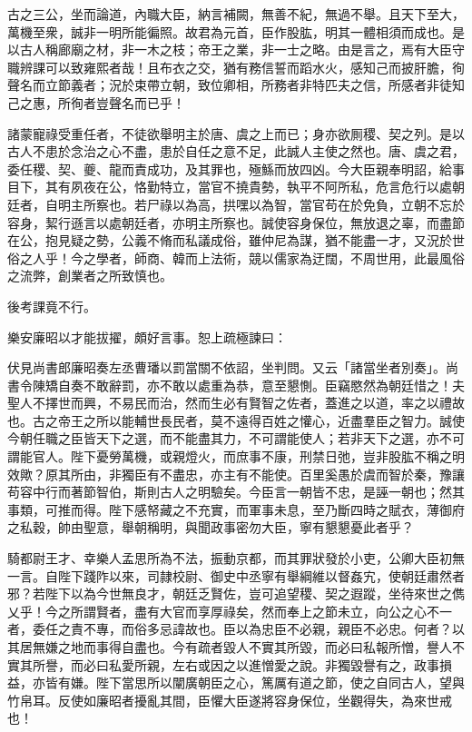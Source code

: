 \begin{pinyinscope}
 
 
 
 古之三公，坐而論道，內職大臣，納言補闕，無善不紀，無過不舉。且天下至大，萬機至衆，誠非一明所能徧照。故君為元首，臣作股肱，明其一體相須而成也。是以古人稱廊廟之材，非一木之枝；帝王之業，非一士之略。由是言之，焉有大臣守職辨課可以致雍熙者哉！且布衣之交，猶有務信誓而蹈水火，感知己而披肝膽，徇聲名而立節義者；況於束帶立朝，致位卿相，所務者非特匹夫之信，所感者非徒知己之惠，所徇者豈聲名而已乎！
 
 
 
 
 諸蒙寵祿受重任者，不徒欲舉明主於唐、虞之上而已；身亦欲厠稷、契之列。是以古人不患於念治之心不盡，患於自任之意不足，此誠人主使之然也。唐、虞之君，委任稷、契、夔、龍而責成功，及其罪也，殛鯀而放四凶。今大臣親奉明詔，給事目下，其有夙夜在公，恪勤特立，當官不撓貴勢，執平不阿所私，危言危行以處朝廷者，自明主所察也。若尸祿以為高，拱嘿以為智，當官苟在於免負，立朝不忘於容身，絜行遜言以處朝廷者，亦明主所察也。誠使容身保位，無放退之辜，而盡節在公，抱見疑之勢，公義不脩而私議成俗，雖仲尼為謀，猶不能盡一才，又況於世俗之人乎！今之學者，師商、韓而上法術，競以儒家為迂闊，不周世用，此最風俗之流弊，創業者之所致慎也。
 
 
後考課竟不行。
 
 
 
 
 樂安廉昭以才能拔擢，頗好言事。恕上疏極諫曰：
 
 
 
 
 伏見尚書郎廉昭奏左丞曹璠以罰當關不依詔，坐判問。又云「諸當坐者別奏」。尚書令陳矯自奏不敢辭罰，亦不敢以處重為恭，意至懇惻。臣竊愍然為朝廷惜之！夫聖人不擇世而興，不易民而治，然而生必有賢智之佐者，蓋進之以道，率之以禮故也。古之帝王之所以能輔世長民者，莫不遠得百姓之懽心，近盡羣臣之智力。誠使今朝任職之臣皆天下之選，而不能盡其力，不可謂能使人；若非天下之選，亦不可謂能官人。陛下憂勞萬機，或親燈火，而庶事不康，刑禁日弛，豈非股肱不稱之明效歟？原其所由，非獨臣有不盡忠，亦主有不能使。百里奚愚於虞而智於秦，豫讓苟容中行而著節智伯，斯則古人之明驗矣。今臣言一朝皆不忠，是誣一朝也；然其事類，可推而得。陛下感帑藏之不充實，而軍事未息，至乃斷四時之賦衣，薄御府之私穀，帥由聖意，舉朝稱明，與聞政事密勿大臣，寧有懇懇憂此者乎？
 
 
 
 
 騎都尉王才、幸樂人孟思所為不法，振動京都，而其罪狀發於小吏，公卿大臣初無一言。自陛下踐阼以來，司隷校尉、御史中丞寧有舉綱維以督姦宄，使朝廷肅然者邪？若陛下以為今世無良才，朝廷乏賢佐，豈可追望稷、契之遐蹤，坐待來世之儁乂乎！今之所謂賢者，盡有大官而享厚祿矣，然而奉上之節未立，向公之心不一者，委任之責不專，而俗多忌諱故也。臣以為忠臣不必親，親臣不必忠。何者？以其居無嫌之地而事得自盡也。今有疏者毀人不實其所毀，而必曰私報所憎，譽人不實其所譽，而必曰私愛所親，左右或因之以進憎愛之說。非獨毀譽有之，政事損益，亦皆有嫌。陛下當思所以闡廣朝臣之心，篤厲有道之節，使之自同古人，望與竹帛耳。反使如廉昭者擾亂其間，臣懼大臣遂將容身保位，坐觀得失，為來世戒也！
 

\end{pinyinscope}
